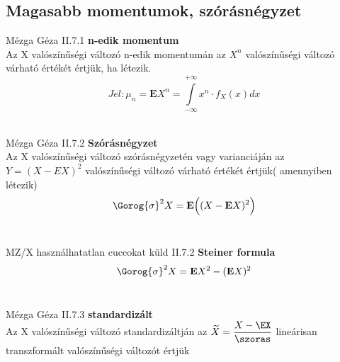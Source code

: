 \subsection{Magasabb momentumok, szórásnégyzet}

  \begin{definicio}{Mézga Géza}
	II.7.1 \textbf{n-edik momentum} \\[3pt]
	Az X valószínűségi változó n-edik momentumán az $X^n$ valószínűségi változó várható értékét értjük, ha létezik. \\[3pt]
	$$Jel: \mu_n =  \textbf{E}X^n = \int\limits_{-\infty}^{+\infty} x^n \cdot f_X(x) dx$$\\[3pt]
  \end{definicio}
  \begin{definicio}{Mézga Géza}
	II.7.2 \textbf{Szórásnégyzet}\\[3pt]
		Az X valószínűségi változó szórásnégyzetén vagy varianciáján az $ Y = (X - EX)^2$ valószínűségi változó várható értékét értjük( amennyiben létezik)
	$$\Gorog{\sigma}^2X = \textbf{E}\Big( (X-\textbf{E}X)^2 \Big) $$\\[3pt]
  \end{definicio}

  \begin{tetel}{MZ/X használhatatlan cuccokat küld}
	II.7.2 \textbf{Steiner formula}\\[-6pt]

	$$\Gorog{\sigma}^2X = \textbf{E}X^2 - (\textbf{E}X)^2 $$\\[3pt]

  \end{tetel}

	\begin{definicio}{Mézga Géza}
  II.7.3 \textbf{standardizált}\\[3pt]
	Az X valószínűségi változó standardizáltján az $\widetilde{X} = \dfrac{X-\EX}{\szoras} $ lineárisan transzformált valószínűségi változót értjük
\end{definicio}
